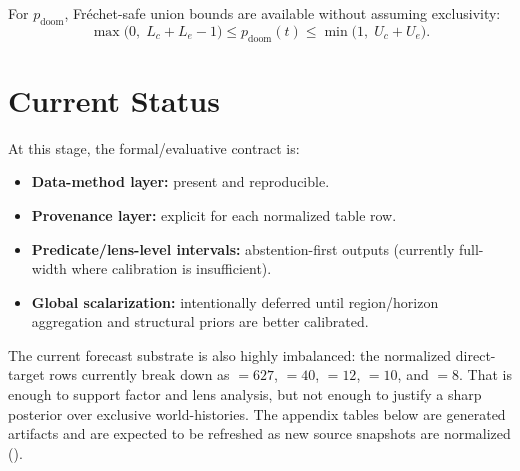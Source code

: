 \documentclass[11pt,openany]{report}
\begin{document}
For $p_{\mathrm{doom}}$, Fr\'{e}chet-safe union bounds are available
without assuming exclusivity:
\[
  \max\!\bigl(0,\;L_c + L_e - 1\bigr)
  \le p_{\mathrm{doom}}(t) \le
  \min\!\bigl(1,\;U_c + U_e\bigr).
\]

\section{Current Status}

At this stage, the formal/evaluative contract is:
\begin{itemize}
\item \textbf{Data-method layer:} present and reproducible.
\item \textbf{Provenance layer:} explicit for each normalized table row.
\item \textbf{Predicate/lens-level intervals:} abstention-first outputs
  (currently full-width where calibration is insufficient).
\item \textbf{Global scalarization:} intentionally deferred until
  region/horizon aggregation and structural priors are better calibrated.
\end{itemize}
The current forecast substrate is also highly imbalanced: the normalized
direct-target rows currently break down as
 $= 627$,
 $= 40$,
 $= 12$,
 $= 10$, and
 $= 8$.  That is enough to support
factor and lens analysis, but not enough to justify a sharp posterior
over exclusive world-histories.
The appendix tables below are generated artifacts and are expected to be
refreshed as new source snapshots are normalized
().

\begin{table}[htbp]
\centering
\caption{Current coarse-lens status surface from the generated
aggregation summary artifact.}
\label{tab:ai-outcomes-branch-status}
\end{table}
\end{document}

